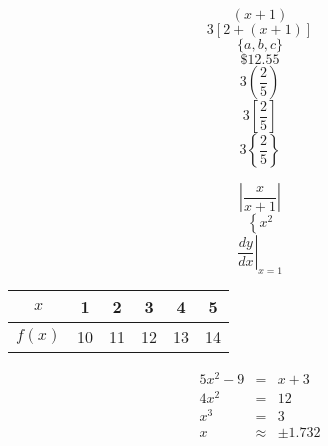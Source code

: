 \documentclass{article}
\begin{document}
$$(x+1)$$
$$3[2+(x+1)]$$
$$\{a,b,c\}$$
$$\$12.55$$
$$3\left(\frac{2}{5}\right)$$
$$3\left[\frac{2}{5}\right]$$
$$3\left\{\frac{2}{5}\right\}$$

$$\left|\frac{x}{x+1}\right|$$
$$\left\{x^2\right.$$
$$\left. \frac{dy}{dx} \right|_{x=1}$$

\begin{tabular}{|c|c|c|c|c|c|}
\hline
$x$ & 1 & 2 & 3 & 4 & 5\\ \hline
$f(x)$ & 10 & 11 & 12 & 13 & 14 \\ \hline
\end{tabular}

\begin{eqnarray*}
5x^2-9&=&x+3\\
4x^2&=&12\\
x^3&=&3\\
x&\approx&\pm1.732
\end{eqnarray*}
\end{document}
